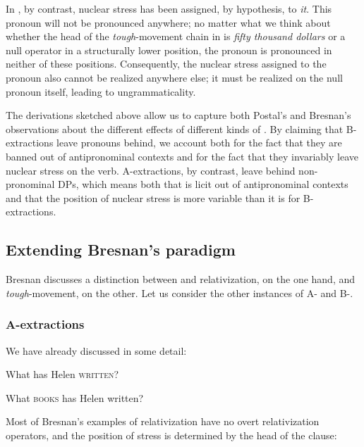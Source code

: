 \documentclass[output=paper]{LSP/langsci}
\begin{document}
  In , by contrast, nuclear stress has been assigned, by hypothesis, to \textit{it}.  This pronoun will not be pronounced anywhere; no matter what we think about whether the head of the \textit{tough}{}-movement chain in  is \textit{fifty thousand dollars} or a null operator in a structurally lower position, the pronoun is pronounced in neither of these positions.  Consequently, the nuclear stress assigned to the pronoun also cannot be realized anywhere else; it must be realized on the null pronoun itself, leading to ungrammaticality.

  The derivations sketched above allow us to capture both Postal's and Bresnan's observations about the different effects of different kinds of .  By claiming that B-extractions leave pronouns behind, we account both for the fact that they are banned out of antipronominal contexts and for the fact that they invariably leave nuclear stress on the verb.  A-extractions, by contrast, leave behind non-pronominal DPs, which means both that  is licit out of antipronominal contexts and that the position of nuclear stress is more variable than it is for B-extractions. 

\subsection{Extending Bresnan's paradigm}

Bresnan discusses a distinction between  and relativization, on the one hand, and \textit{tough}{}-movement, on the other.  Let us consider the other instances of A- and B-.

\subsubsection{ A-extractions}

We have already discussed  in some detail:


\ea%
    \label{ex:richards:46bis}
    
\ea What has Helen \textsc{written}?

\ex What \textsc{books} has Helen written?
\z
\z

Most of Bresnan's examples of relativization have no overt relativization operators, and the position of stress is determined by the head of the  clause:


\ea%
    \label{ex:richards:47bis}
  
\end{document}
